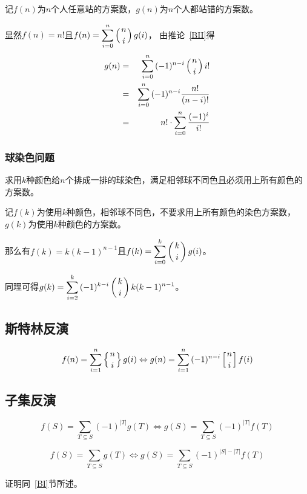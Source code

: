 记$f(n)$为$n$个人任意站的方案数，$g(n)$为$n$个人都站错的方案数。

显然$f(n)=n!$且$\displaystyle f(n)=\sum_{i=0}^n{\left(n \atop i\right) g(i)}$，
由推论~\ref{BII}得
\begin{eqnarray*}
	g(n)&=&\sum_{i=0}^n{(-1)^{n-i}\left(n \atop i\right)i!}\\
	&=&\sum_{i=0}^n{(-1)^{n-i}\frac{n!}{(n-i)!}}\\
	&=&n!\cdot\sum_{i=0}^n{\frac{(-1)^i}{i!}}
\end{eqnarray*}
\subsubsection{球染色问题}
求用$k$种颜色给$n$个排成一排的球染色，满足相邻球不同色且必须用上所有颜色的方案数。

记$f(k)$为使用$k$种颜色，相邻球不同色，不要求用上所有颜色的染色方案数，
$g(k)$为使用$k$种颜色的方案数。

那么有$f(k)=k(k-1)^{n-1}$且$\displaystyle f(k)=\sum_{i=0}^k{\left(k \atop i\right)g(i)}$。

同理可得$\displaystyle g(k)=\sum_{i=2}^k{(-1)^{k-i}\left(k \atop i\right)k(k-1)^{n-1}}$。

\subsection{斯特林反演}
\begin{theorem}
    \begin{displaymath}
        f(n)=\sum_{i=1}^n{\left\{n \atop i\right\}g(i)}
        \Leftrightarrow
        g(n)=\sum_{i=1}^n{(-1)^{n-i}\left[n \atop i\right]f(i)}
    \end{displaymath}
\end{theorem}
\subsection{子集反演}
\begin{theorem}
	\begin{displaymath}
		f(S)=\sum_{T\subseteq S}{(-1)^{|T|}g(T)}
		\Leftrightarrow
		g(S)=\sum_{T\subseteq S}{(-1)^{|T|}f(T)}
	\end{displaymath}
\end{theorem}
\begin{inference}
	\begin{displaymath}
		f(S)=\sum_{T\subseteq S}{g(T)}
		\Leftrightarrow
		g(S)=\sum_{T\subseteq S}{(-1)^{|S|-|T|}f(T)}
	\end{displaymath}
\end{inference}
证明同~\ref{BI}节所述。

